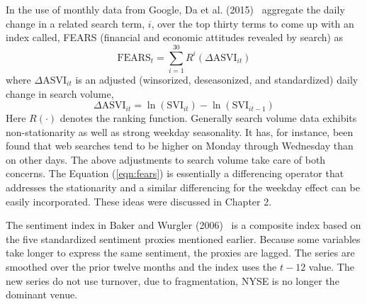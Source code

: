 In the use of monthly data from Google, Da et al. (2015)~\cite{da2015sum} aggregate the daily change in a related search term, $i$, over the top thirty terms to come up with an index called, FEARS (financial and economic attitudes revealed by search) as 
	\begin{equation}\label{eqn:fears}
	\text{FEARS}_t = \sum_{i=1}^{30} R^i (\Delta \text{ASVI}_{it})
	\end{equation}
where $\Delta \text{ASVI}_{it}$ is an adjusted (winsorized, deseasonized, and standardized) daily change in search volume, 
	\begin{equation}
	\Delta \text{ASVI}_{it} = \ln(\text{SVI}_{it}) - \ln(\text{SVI}_{it-1})
	\end{equation}
Here $R(\cdot)$ denotes the ranking function. Generally search volume data exhibits non-stationarity as well as strong weekday seasonality. It has, for instance, been found that web searches tend to be higher on Monday through Wednesday than on other days. The above adjustments to search volume take care of both concerns. The Equation (\ref{eqn:fears}) is essentially a differencing operator that addresses the stationarity and a similar differencing for the weekday effect can be easily incorporated. These ideas were discussed in Chapter 2. 


The sentiment index in Baker and Wurgler (2006)~\cite{baker2006investor} is a composite index based on the five standardized sentiment proxies mentioned earlier. Because some variables take longer to express the same sentiment, the proxies are lagged. The series are smoothed over the prior twelve months and the index uses the $t-12$ value. The new series do not use turnover, due to fragmentation, NYSE is no longer the dominant venue. 


